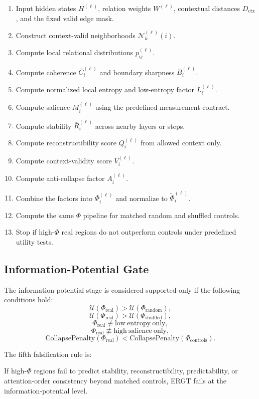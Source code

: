 \documentclass[11pt]{article}
\begin{document}
\begin{enumerate}[label=\arabic*.]
    \item Input hidden states $H^{(\ell)}$, relation weights $W^{(\ell)}$, contextual distances $D_{\mathrm{ctx}}$, and the fixed valid edge mask.
    \item Construct context-valid neighborhoods $\mathcal{N}_k^{(\ell)}(i)$.
    \item Compute local relational distributions $p_{ij}^{(\ell)}$.
    \item Compute coherence $\bar{C}_i^{(\ell)}$ and boundary sharpness $\bar{B}_i^{(\ell)}$.
    \item Compute normalized local entropy and low-entropy factor $L_i^{(\ell)}$.
    \item Compute salience $M_i^{(\ell)}$ using the predefined measurement contract.
    \item Compute stability $\bar{R}_i^{(\ell)}$ across nearby layers or steps.
    \item Compute reconstructibility score $Q_i^{(\ell)}$ from allowed context only.
    \item Compute context-validity score $V_i^{(\ell)}$.
    \item Compute anti-collapse factor $A_i^{(\ell)}$.
    \item Combine the factors into $\Phi_i^{(\ell)}$ and normalize to $\widetilde{\Phi}_i^{(\ell)}$.
    \item Compute the same $\Phi$ pipeline for matched random and shuffled controls.
    \item Stop if high-$\Phi$ real regions do not outperform controls under predefined utility tests.
\end{enumerate}

\subsection{Information-Potential Gate}

The information-potential stage is considered supported only if the following conditions hold:
\[
\mathcal{U}(\Phi_{\mathrm{real}})>
\mathcal{U}(\Phi_{\mathrm{random}}),
\]
\[
\mathcal{U}(\Phi_{\mathrm{real}})>
\mathcal{U}(\Phi_{\mathrm{shuffled}}),
\]
\[
\Phi_{\mathrm{real}}\not\equiv\mathrm{low\ entropy\ only},
\]
\[
\Phi_{\mathrm{real}}\not\equiv\mathrm{high\ salience\ only},
\]
\[
\mathrm{CollapsePenalty}(\Phi_{\mathrm{real}})<\mathrm{CollapsePenalty}(\Phi_{\mathrm{controls}}).
\]

The fifth falsification rule is:
\begin{ergtclaim}
If high-$\Phi$ regions fail to predict stability, reconstructibility, predictability, or attention-order consistency beyond matched controls, ERGT fails at the information-potential level.
\end{ergtclaim}
\end{document}
